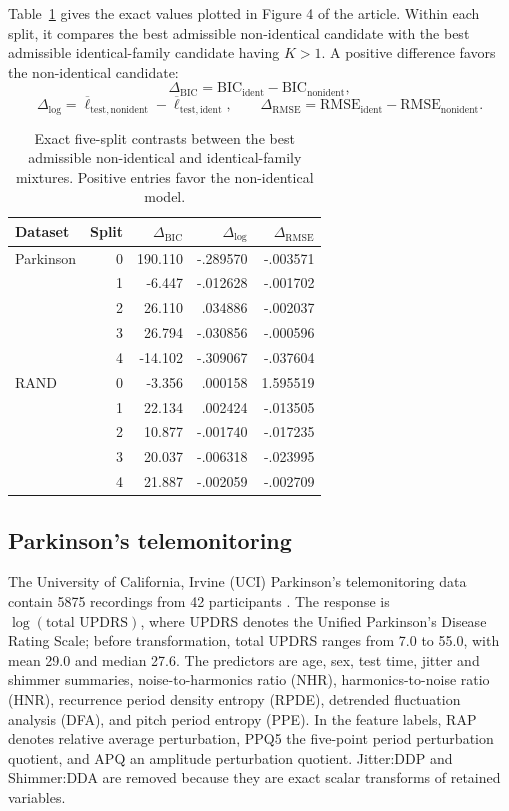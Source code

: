 \documentclass[a4paper,fleqn]{cas-sc}
\numberwithin{equation}{section}
\begin{document}
Table~\ref{supp:tab:split-contrasts} gives the exact values plotted in Figure 4 of the article. Within each split, it compares the best admissible non-identical candidate with the best admissible identical-family candidate having $K>1$. A positive difference favors the non-identical candidate:
\[
 \Delta_{\mathrm{BIC}}=\mathrm{BIC}_{\mathrm{ident}}-\mathrm{BIC}_{\mathrm{nonident}},
\]
\[
 \Delta_{\log}=\overline\ell_{\mathrm{test,nonident}}
 -\overline\ell_{\mathrm{test,ident}},\qquad
 \Delta_{\mathrm{RMSE}}=\mathrm{RMSE}_{\mathrm{ident}}
 -\mathrm{RMSE}_{\mathrm{nonident}}.
\]

\begin{table}[t]
\centering
\caption{Exact five-split contrasts between the best admissible non-identical and identical-family mixtures. Positive entries favor the non-identical model.}
\label{supp:tab:split-contrasts}
\small
\begin{tabular}{lrrrr}
\toprule
Dataset & Split & $\Delta_{\mathrm{BIC}}$ & $\Delta_{\log}$ & $\Delta_{\mathrm{RMSE}}$\\
\midrule
Parkinson & 0 & 190.110 & -.289570 & -.003571\\
 & 1 & -6.447 & -.012628 & -.001702\\
 & 2 & 26.110 & .034886 & -.002037\\
 & 3 & 26.794 & -.030856 & -.000596\\
 & 4 & -14.102 & -.309067 & -.037604\\
RAND & 0 & -3.356 & .000158 & 1.595519\\
 & 1 & 22.134 & .002424 & -.013505\\
 & 2 & 10.877 & -.001740 & -.017235\\
 & 3 & 20.037 & -.006318 & -.023995\\
 & 4 & 21.887 & -.002059 & -.002709\\
\bottomrule
\end{tabular}
\end{table}

\subsection{Parkinson's telemonitoring}

The University of California, Irvine (UCI) Parkinson's telemonitoring data contain 5875 recordings from 42 participants \citep{uci2009parkinsons,tsanas2010parkinsons}. The response is $\log(\text{total UPDRS})$, where UPDRS denotes the Unified Parkinson's Disease Rating Scale; before transformation, total UPDRS ranges from 7.0 to 55.0, with mean 29.0 and median 27.6. The predictors are age, sex, test time, jitter and shimmer summaries, noise-to-harmonics ratio (NHR), harmonics-to-noise ratio (HNR), recurrence period density entropy (RPDE), detrended fluctuation analysis (DFA), and pitch period entropy (PPE). In the feature labels, RAP denotes relative average perturbation, PPQ5 the five-point period perturbation quotient, and APQ an amplitude perturbation quotient. Jitter:DDP and Shimmer:DDA are removed because they are exact scalar transforms of retained variables.
\end{document}
